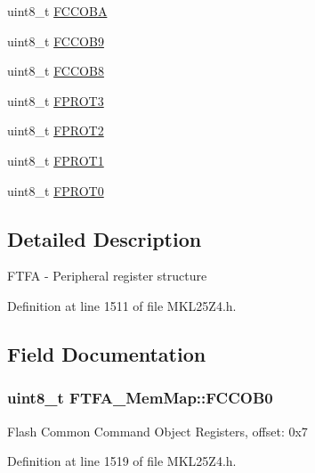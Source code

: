 \begin{DoxyCompactItemize}
\item 
uint8\+\_\+t \hyperlink{struct_f_t_f_a___mem_map_ab167db24e2f5b86e4498c713331b41fc}{F\+C\+C\+O\+BA}
\item 
uint8\+\_\+t \hyperlink{struct_f_t_f_a___mem_map_ad58eb2c520219ec46caa68d6556dc479}{F\+C\+C\+O\+B9}
\item 
uint8\+\_\+t \hyperlink{struct_f_t_f_a___mem_map_a4827886fc87b827ebb288972ff05f5c3}{F\+C\+C\+O\+B8}
\item 
uint8\+\_\+t \hyperlink{struct_f_t_f_a___mem_map_ad373eeb57136eb15831fa521d94d7858}{F\+P\+R\+O\+T3}
\item 
uint8\+\_\+t \hyperlink{struct_f_t_f_a___mem_map_a86f1c8547579b9a1b381c2f7fdaf03ef}{F\+P\+R\+O\+T2}
\item 
uint8\+\_\+t \hyperlink{struct_f_t_f_a___mem_map_a74c0cb8e137d3f4df7283f4b15203845}{F\+P\+R\+O\+T1}
\item 
uint8\+\_\+t \hyperlink{struct_f_t_f_a___mem_map_aba5bfab2704e58af5ecacdb6b7faccbc}{F\+P\+R\+O\+T0}
\end{DoxyCompactItemize}


\subsection{Detailed Description}
F\+T\+FA -\/ Peripheral register structure 

Definition at line 1511 of file M\+K\+L25\+Z4.\+h.



\subsection{Field Documentation}
\subsubsection[{\texorpdfstring{F\+C\+C\+O\+B0}{FCCOB0}}]{\setlength{\rightskip}{0pt plus 5cm}uint8\+\_\+t F\+T\+F\+A\+\_\+\+Mem\+Map\+::\+F\+C\+C\+O\+B0}\hypertarget{struct_f_t_f_a___mem_map_a00d6a6b8dd8b276346a2ed32e74d1e5a}{}\label{struct_f_t_f_a___mem_map_a00d6a6b8dd8b276346a2ed32e74d1e5a}
Flash Common Command Object Registers, offset\+: 0x7 

Definition at line 1519 of file M\+K\+L25\+Z4.\+h.

